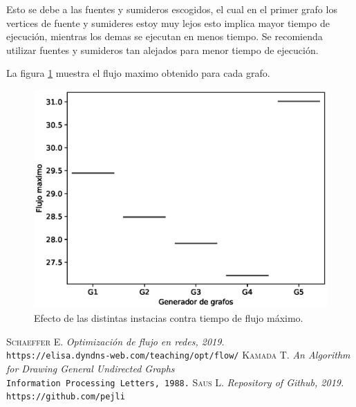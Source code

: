 \documentclass[12pt, a4paper]{article}
\begin{document}
Esto se debe a las fuentes y sumideros escogidos, el cual en el primer grafo los vertices de fuente y sumideres estoy muy lejos esto implica mayor tiempo de ejecuci\'on, mientras los demas se ejecutan en menos tiempo. Se recomienda utilizar fuentes y sumideros tan alejados para menor tiempo de ejecuci\'on.

La figura \ref{fig: fig2} muestra el flujo maximo obtenido para cada grafo.

\begin{figure} [H] \centering
\includegraphics[scale=0.8]{figura2}
\caption{Efecto de las distintas instacias contra tiempo de flujo m\'aximo.}
\label{fig: fig2}
\end{figure}



\begin{thebibliography}{X}
 \textsc{Schaeffer E.} \textit{Optimización de flujo en redes, 2019.} \\
\texttt{https://elisa.dyndns-web.com/teaching/opt/flow/}
 \textsc{Kamada T.} \textit{An Algorithm for Drawing General Undirected Graphs} \\
\texttt{Information Processing Letters, 1988.}
 \textsc{Saus L.} \textit{Repository of Github, 2019.} \\
\texttt{https://github.com/pejli}
\end{thebibliography}
\end{document}
